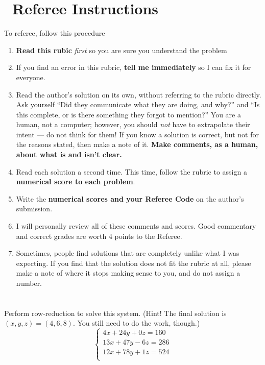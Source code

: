\documentclass[10pt,twoside]{article}
\begin{document}
\setcounter{section}{-1}



\section{~Referee Instructions}
To referee, follow this procedure
\begin{enumerate}


\item \textbf{Read this rubic} \emph{first} so you are sure you understand the problem

\item If you find an error in this rubric, \textbf{tell me immediately} so I
can fix it for everyone.

\item Read the author's solution on its own, without referring to the rubric
directly.  Ask yourself ``Did they communicate what they are doing, and why?''
and ``Is this complete, or is there something they forgot to mention?''  You
are a human, not a computer; however, you should \emph{not} have to extrapolate
their intent --- do not think for them!  If you know a solution is correct, but
not for the reasons stated, then make a note of it.  \textbf{Make comments, as
a human, about what is and isn't clear.}  

\item Read each solution a second time.  This time, follow the rubric to assign a \textbf{numerical score to each
problem}.  

\item Write the \textbf{numerical scores and your Referee Code} on the author's
submission.

\item I will personally review all of these comments and scores.  Good commentary and correct grades are worth 4 points to the Referee.

\item Sometimes, people find solutions that are completely unlike what I was expecting.  If you find that the solution does not fit the rubric at all, please make a note of where it stops making sense to you, and do not assign a number.

\end{enumerate}

\newpage
\section{ }
{\color{red}Perform row-reduction to solve this system.  (Hint!  The final solution is $(x,y,z) =
(4,6,8)$.  You still need to do the work, though.)
\[
\begin{cases}
4x + 24y +0z = 160\\
13x + 47y - 6z = 286\\
12x + 78y + 1z = 524\\
\end{cases}\]
}
\end{document}
